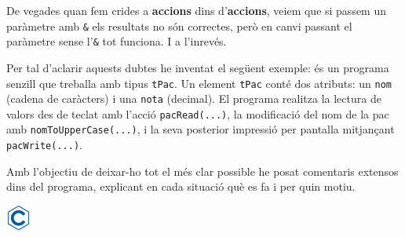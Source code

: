 \documentclass[]{book}
\begin{document}
De vegades quan fem crides a \textbf{accions} dins d'\textbf{accions},
veiem que si passem un paràmetre amb \texttt{\&} els resultats no són
correctes, però en canvi passant el paràmetre sense l'\texttt{\&} tot
funciona. I a l'inrevés.

Per tal d'aclarir aquests dubtes he inventat el següent exemple: és un
programa senzill que treballa amb tipus \texttt{tPac}. Un element
\texttt{tPac} conté dos atributs: un \texttt{nom} (cadena de caràcters)
i una \texttt{nota} (decimal). El programa realitza la lectura de valors
des de teclat amb l'acció \texttt{pacRead(...)}, la modificació del nom
de la pac amb \texttt{nomToUpperCase(...)}, i la seva posterior
impressió per pantalla mitjançant \texttt{pacWrite(...)}.

Amb l'objectiu de deixar-ho tot el més clar possible he posat comentaris
extensos dins del programa, explicant en cada situació què es fa i per
quin motiu.

\includegraphics{./img/c.png}
\end{document}
